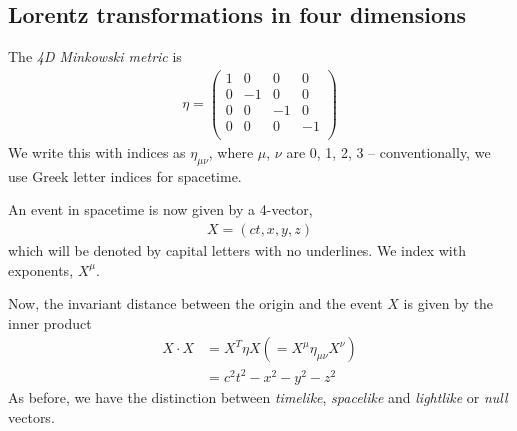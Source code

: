 \documentclass{../template/note}
\begin{document}
    \subsection{Lorentz transformations in four dimensions}

    \begin{definition}
        The \emph{4D Minkowski metric} is
        \begin{align*}
            \eta = \begin{pmatrix}
             1 & 0 & 0 & 0 \\
             0 & -1 & 0 & 0 \\
             0 & 0 & -1 & 0 \\
             0 & 0 & 0 & -1 \\
            \end{pmatrix}
        \end{align*}
        We write this with indices as \(\eta_{\mu\nu}\), where \(\mu\), \(\nu\) are 0, 1, 2, 3 -- conventionally, we use Greek letter indices for spacetime.
    \end{definition}
    An event in spacetime is now given by a 4-vector,
    \begin{align*}
        X = (ct, x, y, z)
    \end{align*}
    which will be denoted by capital letters with no underlines. We index with exponents, \(X^\mu\).

    Now, the invariant distance between the origin and the event \(X\) is given by the inner product
    \begin{align*}
        X \cdot X &= X^T \eta X (=X^\mu \eta_{\mu\nu} X^\nu) \\
        &= c^2t^2 - x^2 - y^2 - z^2
    \end{align*}
    As before, we have the distinction between \emph{timelike}, \emph{spacelike} and \emph{lightlike} or \emph{null} vectors.
\end{document}
